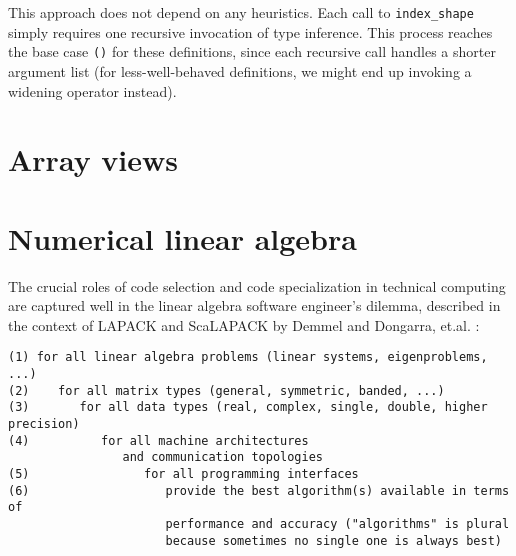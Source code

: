 This approach does not depend on any heuristics. Each call to \texttt{index\_shape}
simply requires one recursive invocation of type inference. This process reaches
the base case \texttt{()} for these definitions, since each recursive call
handles a shorter argument list (for less-well-behaved definitions, we might
end up invoking a widening operator instead).




\section{Array views}

\iffalse
tim holy in issue 8839:

``without staged functions in my initial post in 8235. The take-home message: generating all methods through dimension 8 resulted in more than 5000 separate methods, and required over 4 minutes of parsing \& lowering time (i.e., a 4-minute delay while compiling julia). By comparison, the stagedfunction implementation loads in a snap, and of course can go even beyond 8 dimensions.''
\fi

\section{Numerical linear algebra}
\label{sec:linalg}

The crucial roles of code selection and code specialization in technical
computing are captured well in the linear algebra software engineer's dilemma,
described in the context of LAPACK and ScaLAPACK by Demmel and Dongarra,
et.al. \cite{lawn181}:
\vspace{-3ex}
\begin{singlespace}
\begin{small}
\begin{verbatim}
(1) for all linear algebra problems (linear systems, eigenproblems, ...)
(2)    for all matrix types (general, symmetric, banded, ...)
(3)       for all data types (real, complex, single, double, higher precision)
(4)          for all machine architectures
                and communication topologies
(5)                for all programming interfaces
(6)                   provide the best algorithm(s) available in terms of
                      performance and accuracy ("algorithms" is plural
                      because sometimes no single one is always best)
\end{verbatim}
\end{small}
\end{singlespace}

